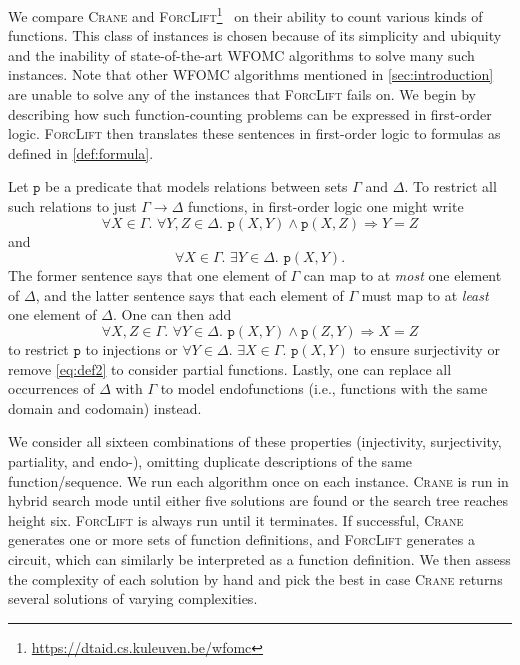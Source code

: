 \documentclass{article}
\theoremstyle{definition}
\theoremstyle{remark}
\begin{document}

We compare \textsc{Crane} and
\textsc{ForcLift}\footnote{\url{https://dtaid.cs.kuleuven.be/wfomc}}~\cite{DBLP:conf/ijcai/BroeckTMDR11}
on their ability to count various kinds of functions. This class of instances is
chosen because of its simplicity and ubiquity and the inability of
state-of-the-art WFOMC algorithms to solve many such instances. Note that other
WFOMC algorithms mentioned in \cref{sec:introduction} are unable to solve any of
the instances that \textsc{ForcLift} fails on. We begin by describing how such
function-counting problems can be expressed in first-order logic.
\textsc{ForcLift} then translates these sentences in first-order logic to
formulas as defined in \cref{def:formula}.

Let $\texttt{p}$ be a predicate that models relations between sets $\Gamma$ and
$\Delta$. To restrict all such relations to just $\Gamma \to \Delta$ functions,
in first-order logic one might write
\[
  \forall X \in \Gamma\text{. }\forall Y,Z \in \Delta\text{. }\texttt{p}(X, Y) \land \texttt{p}(X, Z) \Rightarrow Y = Z
\]
and
\begin{equation}\label{eq:def2}
  \forall X \in \Gamma\text{. }\exists Y \in \Delta\text{. }\texttt{p}(X, Y).
\end{equation}
The former sentence says that one element of $\Gamma$ can map to at \emph{most}
one element of $\Delta$, and the latter sentence says that each element of
$\Gamma$ must map to at \emph{least} one element of $\Delta$. One can then add
\[
  \forall X,Z \in \Gamma\text{. }\forall Y \in \Delta\text{. }\texttt{p}(X, Y) \land \texttt{p}(Z, Y) \Rightarrow X = Z
\]
to restrict $\texttt{p}$ to injections or
  $\forall Y \in \Delta\text{. }\exists X \in \Gamma\text{. }\texttt{p}(X, Y)$
to ensure surjectivity or remove \cref{eq:def2} to consider partial functions.
Lastly, one can replace all occurrences of $\Delta$ with $\Gamma$ to model
endofunctions (i.e., functions with the same domain and codomain) instead.

We consider all sixteen combinations of these properties (injectivity,
surjectivity, partiality, and endo-), omitting duplicate descriptions of the
same function/sequence. We run each algorithm once on each instance.
\textsc{Crane} is run in hybrid search mode until either five solutions are
found or the search tree reaches height six. \textsc{ForcLift} is always run
until it terminates. If successful, \textsc{Crane} generates one or more sets of
function definitions, and \textsc{ForcLift} generates a circuit, which can
similarly be interpreted as a function definition. We then assess the complexity
of each solution by hand and pick the best in case \textsc{Crane} returns
several solutions of varying complexities.
\end{document}
